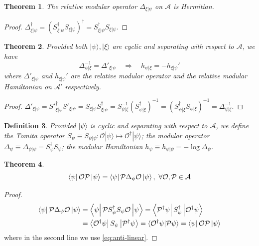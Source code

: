 \documentclass[a4paper,11pt]{article}
\newtheorem{thm}{Theorem}[section]
\newtheorem{defn}[thm]{Definition}
\newcommand{\ket}[1]{| #1 \rangle } %
\newcommand{\braket}[2]{\langle  #1 \vphantom{#2} | #2 \vphantom{#1} \rangle } %
\newcommand{\diracprod}[3]{\left\langle  #1 \vphantom{#2#3} \right|#2 \left| #3 \vphantom{#1#2} \right\rangle } %
\renewcommand{\=}[1]{\stackrel{#1}{=}} %
\def\A{\mathcal{A}}
\def\O{\mathcal{O}}
\def\P{\mathcal{P}}
\begin{document}
\begin{thm}
	The relative modular operator $\Delta_{\xi|\psi}$ on $\A$ is Hermitian.
\end{thm}

\begin{proof}
	$\Delta_{\xi|\psi}^\dagger=\left(S^\dagger_{\xi|\psi}S_{\xi|\psi}\right)^\dagger=S^\dagger_{\xi|\psi}S_{\xi|\psi}$.
\end{proof}

\begin{thm}
	Provided both $\ket{\psi},\ket{\xi}$ are cyclic and separating with respect to $\A$, we have
	\begin{equation}
		\Delta_{\psi|\xi}^{-1}=\Delta'_{\xi|\psi}\quad\Rightarrow\quad h_{\psi|\xi}=-h_{\xi|\psi}'
	\end{equation}
	where $\Delta'_{\xi|\psi}$ and $h_{\xi|\psi}'$ are the relative modular operator and the relative modular Hamiltonian on $\A'$ respectively.
\end{thm}

\begin{proof}
	$\Delta'_{\xi|\psi}=S'^\dagger_{\xi|\psi}S'_{\xi|\psi}=S_{\xi|\psi}S^\dagger_{\xi|\psi}=S^{-1}_{\psi|\xi}(S^\dagger_{\psi|\xi})^{-1}=(S^\dagger_{\psi|\xi}S_{\psi|\xi})^{-1}=\Delta_{\psi|\xi}^{-1}$.
\end{proof}

\begin{defn}
	Provided $\ket{\psi}$ is cyclic and separating with respect to $\A$, we define the Tomita operator $S_{\psi}\equiv S_{\psi|\psi}:\O\ket{\psi}\mapsto\O^\dagger \ket{\psi}$; the modular operator $\Delta_{\psi}\equiv\Delta_{\psi|\psi}= S^\dagger_{\psi}S_{\psi}$; the modular Hamiltonian $h_{\psi}\equiv h_{\psi|\psi}=-\log \Delta_{\psi}$.
\end{defn}


\begin{thm}
	\begin{equation}
		\diracprod{\psi}{\O\P}{\psi}=\diracprod{\psi}{\P\Delta_{\psi}\O}{\psi},~\forall\O,\P\in\A
	\end{equation}
\end{thm}

\begin{proof}
	\begin{align*}
		\diracprod{\psi}{\P\Delta_{\psi}\O}{\psi}&=\diracprod{\psi}{\P S^\dagger_{\psi}S_{\psi}\O}{\psi}=\diracprod{\P^\dagger\psi}{ S^\dagger_{\psi}}{\O^\dagger\psi}\\
		&=\diracprod{\O^\dagger\psi}{ S_{\psi}}{\P^\dagger\psi}=\braket{\O^\dagger\psi}{\P\psi}=\diracprod{\psi}{\O\P}{\psi}
	\end{align*}
	where in the second line we use \eqref{eq:anti-linear}.
\end{proof}	
\end{document}
